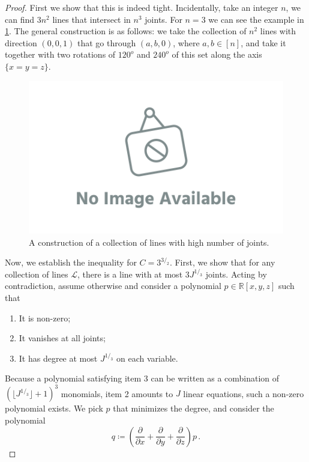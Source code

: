 \documentclass[12pt]{amsart}
\theoremstyle{definition}
\newcommand{\R}{\mathbb{R}}
\begin{document}
\begin{proof}
First we show that this is indeed tight.
Incidentally, take an integer $n$, we can find $3n^2$ lines that intersect in $n^3$ joints. For $n=3$ we can see the example in \cref{fig:joints}.
The general construction is as follows: we take the collection of $n^2$ lines with direction $(0, 0, 1)$ that go through $(a, b, 0)$, where $a, b\in [n]$, and take it together with two rotations of $120^o$ and $240^o$ of this set along the axis $\{x = y = z\}$.

\begin{figure}[h]
\includegraphics[scale=.1]{../imgs/ina.png}%
\caption{A construction of a collection of lines with high number of joints.\label{fig:joints}}
\end{figure}

Now, we establish the inequality for $C = 3^{3/_2}$.
First, we show that for any collection of lines $\mathcal L$, there is a line with at most $3 J^{1/_3}$ joints.
Acting by contradiction, assume otherwise and consider a polynomial $p \in \R[x, y, z]$ such that 
\begin{enumerate}
\item It is non-zero;

\item It vanishes at all joints;

\item It has degree at most $J^{1/_3}$ on each variable.
\end{enumerate}

Because a polynomial satisfying item 3 can be written as a combination of $(\lfloor J^{1/_3}\rfloor + 1)^3$ monomials, item 2 amounts to $J$ linear equations, such a non-zero polynomial exists.
We pick $p$ that minimizes the degree, and consider the polynomial
$$q \coloneqq \left(\frac{\partial}{\partial x} + \frac{\partial}{\partial y} + \frac{\partial}{\partial z} \right) p \, .$$


\end{proof}
\end{document}
